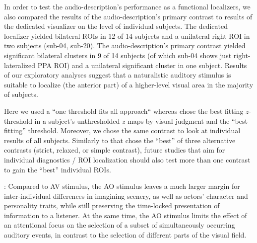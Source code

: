 \documentclass[english]{article}
\begin{document}


In order to test the audio-description's performance as a functional localizers,
we also compared the results of the audio-description's primary contrast to
results of the dedicated visualizer on the level of individual subjects.
The dedicated localizer \citep{sengupta2016extension} yielded bilateral ROIs in
12 of 14 subjects and a unilateral right ROI in two subjects (sub-04, sub-20).
The audio-description's primary contrast yielded significant bilateral clusters
in 9 of 14 subjects (of which sub-04 shows just right-lateralized PPA ROI)  and
a unilateral significant cluster in one subject.
Results of our exploratory analyses suggest that a naturalistic auditory
stimulus is suitable to localize (the anterior part) of a higher-level visual
area in the majority of subjects.

Here we used a ``one threshold fits all approach`` whereas
\citep{sengupta2016extension} chose the best fitting $z$-threshold in a
subject's unthresholded $z$-maps by visual judgment and the ``best fitting''
threshold.
Moreover, we chose the same contrast to look at individual results of all
subjects.
Similarly to \citep{sengupta2016extension} that chose the ``best'' of three
alternative contrasts (strict, relaxed, or simple contrast), future studies that
aim for individual diagnostics / ROI localization should also test more than one
contrast to gain the ``best'' individual ROIs.

\citep{hanke2014audiomovie}: Compared to AV stimulus, the AO stimulus leaves a
much larger margin for inter-individual differences in imagining scenery, as
well as actors' character and personality traits, while still preserving the
time-locked presentation of information to a listener. At the same time, the AO
stimulus limits the effect of an attentional focus on the selection of a subset
of simultaneously occurring auditory events, in contrast to the selection of
different parts of the visual field.

\end{document}
